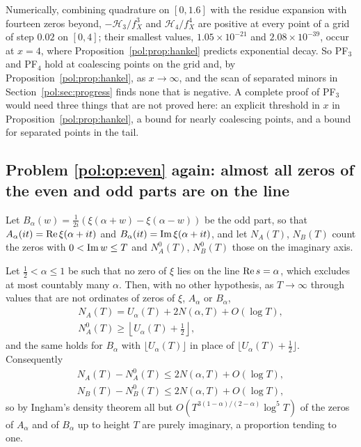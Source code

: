 Numerically, combining quadrature on $[0,1.6]$ with the residue expansion with fourteen zeros beyond, $-\mathcal H_3/f_X^3$ and $\mathcal H_4/f_X^4$ are positive at every point of a grid of step $0.02$ on $[0,4]$; their smallest values, $1.05\times10^{-21}$ and $2.08\times10^{-39}$, occur at $x=4$, where Proposition~\ref{pol:prop:hankel} predicts exponential decay. So PF$_3$ and PF$_4$ hold at coalescing points on the grid and, by Proposition~\ref{pol:prop:hankel}, as $x\to\infty$, and the scan of separated minors in Section~\ref{pol:sec:progress} finds none that is negative. A complete proof of PF$_3$ would need three things that are not proved here: an explicit threshold in $x$ in Proposition~\ref{pol:prop:hankel}, a bound for nearly coalescing points, and a bound for separated points in the tail.

\subsection{Problem \ref{pol:op:even} again: almost all zeros of the even and odd parts are on the line}

Let $B_\alpha(w)=\frac1{2i}(\xi(\alpha+w)-\xi(\alpha-w))$ be the odd part, so that $A_\alpha(it)=\operatorname{Re}\xi(\alpha+it)$ and $B_\alpha(it)=\operatorname{Im}\xi(\alpha+it)$, and let $N_A(T)$, $N_B(T)$ count the zeros with $0<\operatorname{Im} w\le T$ and $N_A^0(T)$, $N_B^0(T)$ those on the imaginary axis.

\begin{theorem}\label{pol:thm:accounting}
Let $\frac12<\alpha\le1$ be such that no zero of $\xi$ lies on the line $\operatorname{Re} s=\alpha$, which excludes at most countably many $\alpha$. Then, with no other hypothesis, as $T\to\infty$ through values that are not ordinates of zeros of $\xi$, $A_\alpha$ or $B_\alpha$,
\begin{equation}\label{pol:eq:accounting}
\begin{gathered}
N_A(T)=U_\alpha(T)+2N(\alpha,T)+O(\log T),\\
N_A^0(T)\ge\left\lfloor U_\alpha(T)+\tfrac12\right\rfloor,
\end{gathered}
\end{equation}
and the same holds for $B_\alpha$ with $\lfloor U_\alpha(T)\rfloor$ in place of $\lfloor U_\alpha(T)+\frac12\rfloor$. Consequently
\begin{equation}\label{pol:eq:offaxis}
\begin{gathered}
N_A(T)-N_A^0(T)\le2N(\alpha,T)+O(\log T),\\
N_B(T)-N_B^0(T)\le2N(\alpha,T)+O(\log T),
\end{gathered}
\end{equation}
so by Ingham's density theorem all but $O(T^{3(1-\alpha)/(2-\alpha)}\log^5T)$ of the zeros of $A_\alpha$ and of $B_\alpha$ up to height $T$ are purely imaginary, a proportion tending to one.
\end{theorem}

